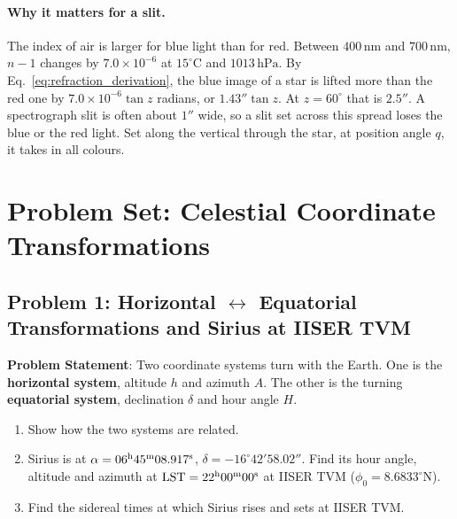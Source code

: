 \paragraph{Why it matters for a slit.} The index of air is larger for blue light than for red. Between $400\,\mathrm{nm}$ and $700\,\mathrm{nm}$, $n-1$ changes by $7.0\times10^{-6}$ at $15^\circ\mathrm C$ and $1013\,\mathrm{hPa}$. By Eq.~\eqref{eq:refraction_derivation}, the blue image of a star is lifted more than the red one by $7.0\times10^{-6}\tan z$ radians, or $1.43''\tan z$. At $z=60^\circ$ that is $2.5''$. A spectrograph slit is often about $1''$ wide, so a slit set across this spread loses the blue or the red light. Set along the vertical through the star, at position angle $q$, it takes in all colours.

\section{Problem Set: Celestial Coordinate Transformations}
\label{co:sec:problems}

\subsection{Problem 1: Horizontal $\leftrightarrow$ Equatorial Transformations and Sirius at IISER TVM}
\label{co:prob:sirius}

\textbf{Problem Statement}: Two coordinate systems turn with the Earth. One is the \textbf{horizontal system}, altitude $h$ and azimuth $A$. The other is the turning \textbf{equatorial system}, declination $\delta$ and hour angle $H$.
\begin{enumerate}[label=(\alph*)]
	\item Show how the two systems are related.
	\item Sirius is at $\alpha=06^{\rm h}45^{\rm m}08.917^{\rm s}$, $\delta=-16^\circ42'58.02''$. Find its hour angle, altitude and azimuth at $\mathrm{LST}=22^{\rm h}00^{\rm m}00^{\rm s}$ at IISER TVM ($\phi_0=8.6833^\circ\mathrm N$).
	\item Find the sidereal times at which Sirius rises and sets at IISER TVM.
\end{enumerate}


